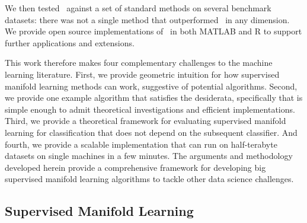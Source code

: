 \documentclass[10pt]{article}
\begin{document}
We then tested \Lol~against a set of standard methods on  several benchmark datasets:  there was not a single method that outperformed \Lol~in any dimension.
We provide open source implementations of \Lol~in both MATLAB and R to support further applications and extensions.  


This work therefore makes four complementary challenges to the machine learning literature.  
First, we provide geometric intuition for how supervised manifold learning methods can work, suggestive of potential algorithms.  
Second, we provide one example algorithm that satisfies the desiderata, specifically that is simple enough to admit theoretical investigations and efficient implementations.  
Third, we provide a theoretical framework for evaluating supervised manifold learning for classification that does not depend on the subsequent classifier.
And fourth, we provide a scalable implementation that can run on half-terabyte datasets on single machines in a few minutes. 
The arguments and methodology developed herein provide a comprehensive framework for developing big supervised manifold learning algorithms to tackle other data science challenges.





\subsection*{Supervised Manifold Learning}
\end{document}
